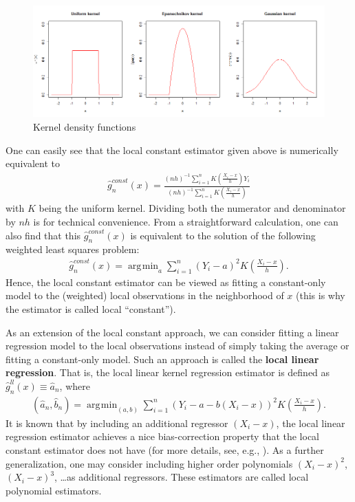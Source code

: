 \documentclass[10.5pt, A4paper, openany, uplatex]{book}
\renewcommand{\hat}{\widehat}
\numberwithin{equation}{section}
\DeclareMathOperator*{\argmin}{\arg\!\min}
\begin{document}
\begin{figure}[h!]
	\begin{center}
		\includegraphics[width = 18cm]{kernels.png}
		\caption{Kernel density functions}\label{fig:kernels}
	\end{center}
\end{figure}

One can easily see that the local constant estimator given above is numerically equivalent to
\begin{align*}
	\hat g^{const}_n(x) = \frac{(nh)^{-1}\sum_{i = 1}^n K\left( \frac{X_i - x}{h}\right) Y_i}{(nh)^{-1}\sum_{i = 1}^n K\left( \frac{X_i - x}{h}\right)}
\end{align*}
with $K$ being the uniform kernel.
Dividing both the numerator and denominator by $nh$ is for technical convenience.
From a straightforward calculation, one can also find that this $\hat g^{const}_n(x)$ is equivalent to the solution of the following weighted least squares problem:
\begin{align*}
	\hat g^{const}_n(x) = \argmin_a \sum_{i = 1}^n (Y_i - a)^2K\left( \frac{X_i - x}{h}\right).
\end{align*}
Hence, the local constant estimator can be viewed as fitting a constant-only model to the (weighted) local observations in the neighborhood of $x$ (this is why the estimator is called local ``constant'').

As an extension of the local constant approach, we can consider fitting a linear regression model to the local observations instead of simply taking the average or fitting a constant-only model.
Such an approach is called the \textbf{local linear regression}.
That is, the local linear kernel regression estimator is defined as $\hat g^{ll}_n(x) \equiv \hat a_n$, where
\begin{align*}
	(\hat a_n, \hat b_n) = \argmin_{(a, b)} \sum_{i = 1}^n (Y_i - a - b (X_i -x))^2K\left( \frac{X_i - x}{h}\right).
\end{align*}
It is known that by including an additional regressor $(X_i - x)$, the local linear regression estimator achieves a nice bias-correction property that the local constant estimator does not have (for more details, see, e.g., \cite{li2007nonparametric}).
As a further generalization, one may consider including higher order polynomials $(X_i - x)^2$, $(X_i - x)^3$, \ldots as additional regressors.
These estimators are called local polynomial estimators.
\end{document}
